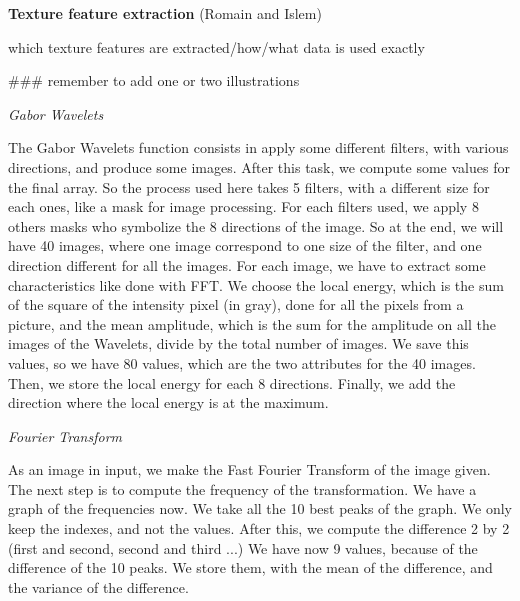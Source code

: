 \textbf{Texture feature extraction} (Romain and Islem)

which texture features are extracted/how/what data is used exactly

### remember to add one or two illustrations 

    \textit{Gabor Wavelets}

The Gabor Wavelets function consists in apply some different filters, with various directions, and produce some images. After this task, we compute some values for the final array. So the process used here takes 5 filters, with a different size for each ones, like a mask for image processing. For each filters used, we apply 8 others masks who symbolize the 8 directions of the image. So at the end, we will have 40 images, where one image correspond to one size of the filter, and one direction different for all the images. For each image, we have to extract some characteristics like done with FFT. We choose the local energy, which is the sum of the square of the intensity pixel (in gray), done for all the pixels from a picture, and the mean amplitude, which is the sum for the amplitude on all the images of the Wavelets, divide by the total number of images. We save this values, so we have 80 values, which are the two attributes for the 40 images. Then, we store the local energy for each 8 directions. Finally, we add the direction where the local energy is at the maximum.

    \textit{Fourier Transform}

As an image in input, we make the Fast Fourier Transform of the image given. The next step is to compute the frequency of the transformation. We have a graph of the frequencies now. We take all the 10 best peaks of the graph. We only keep the indexes, and not the values. After this, we compute the difference 2 by 2 (first and second, second and third ...) We have now 9 values, because of the difference of the 10 peaks. We store them, with the mean of the difference, and the variance of the difference.
    
    
    